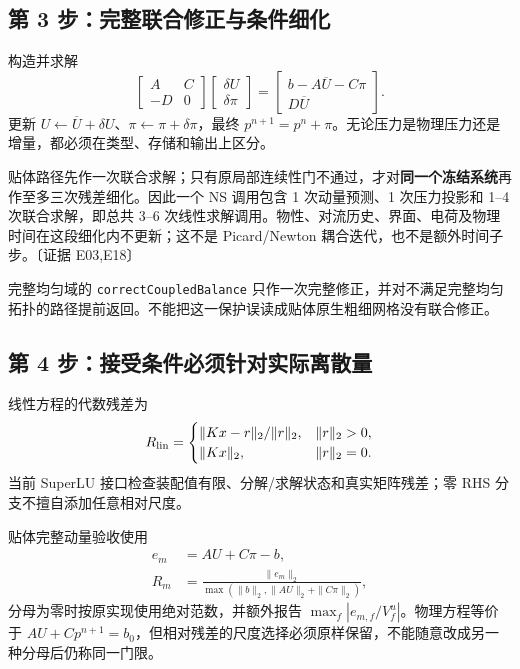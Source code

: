 \documentclass[UTF8,a4paper,11pt,fontset=fandol]{ctexart}
\newcommand{\code}[1]{\nolinkurl{#1}}
\newcommand{\ev}[1]{{\small\color{muted}〔证据 #1〕}}
\begin{document}
\subsection{第 3 步：完整联合修正与条件细化}
构造并求解
\begin{equation}
 \begin{bmatrix}A&C\\-D&0\end{bmatrix}
 \begin{bmatrix}\delta U\\\delta\pi\end{bmatrix}
 =\begin{bmatrix}b-A\overline U-C\pi\\D\overline U\end{bmatrix}.
 \label{eq:coupled}
\end{equation}
更新 $U\leftarrow\overline U+\delta U$、$\pi\leftarrow\pi+\delta\pi$，最终 $p^{n+1}=p^n+\pi$。无论压力是物理压力还是增量，都必须在类型、存储和输出上区分。

贴体路径先作一次联合求解；只有原局部连续性门不通过，才对\textbf{同一个冻结系统}再作至多三次残差细化。因此一个 NS 调用包含 1 次动量预测、1 次压力投影和 1--4 次联合求解，即总共 3--6 次线性求解调用。物性、对流历史、界面、电荷及物理时间在这段细化内不更新；这不是 Picard/Newton 耦合迭代，也不是额外时间子步。\ev{E03,E18}

完整均匀域的 \code{correctCoupledBalance} 只作一次完整修正，并对不满足完整均匀拓扑的路径提前返回。不能把这一保护误读成贴体原生粗细网格没有联合修正。

\subsection{第 4 步：接受条件必须针对实际离散量}
线性方程的代数残差为
\[
 R_{\rm lin}=\begin{cases}
 \|Kx-r\|_2/\|r\|_2,&\|r\|_2>0,\\
 \|Kx\|_2,&\|r\|_2=0.
 \end{cases}
\]
当前 SuperLU 接口检查装配值有限、分解/求解状态和真实矩阵残差；零 RHS 分支不擅自添加任意相对尺度。

贴体完整动量验收使用
\begin{align}
 e_m&=AU+C\pi-b,\\
 R_m&=\frac{\|e_m\|_2}{\max(\|b\|_2,\|AU\|_2+\|C\pi\|_2)},
 \label{eq:mres}
\end{align}
分母为零时按原实现使用绝对范数，并额外报告 $\max_f|e_{m,f}/V_f^u|$。物理方程等价于 $AU+Cp^{n+1}=b_0$，但相对残差的尺度选择必须原样保留，不能随意改成另一种分母后仍称同一门限。
\end{document}

